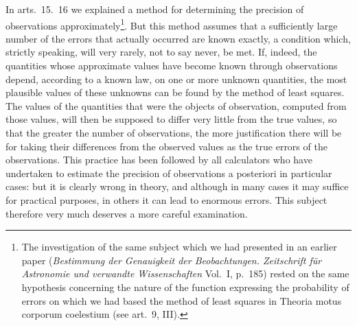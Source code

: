 In arts.\ 15.\ 16 we explained a method for determining the precision of observations approximately\footnote{The investigation of the same subject which we had presented in an earlier paper (\textit{Bestimmung der Genauigkeit der Beobachtungen. Zeitschrift für Astronomie und verwandte Wissenschaften} Vol.\ I, p.\ 185) rested on the same hypothesis concerning the nature of the function expressing the probability of errors on which we had based the method of least squares in Theoria motus corporum coelestium (see art.\ 9, III).}. But this method assumes that a sufficiently large number of the errors that actually occurred are known exactly, a condition which, strictly speaking, will very rarely, not to say never, be met. If, indeed, the quantities whose approximate values have become known through observations depend, according to a known law, on one or more unknown quantities, the most plausible values of these unknowns can be found by the method of least squares. The values of the quantities that were the objects of observation, computed from those values, will then be supposed to differ very little from the
%
true values, so that the greater the number of observations, the more justification there will be for taking their differences from the observed values as the true errors of the observations. This practice has been followed by all calculators who have undertaken to estimate the precision of observations a posteriori in particular cases: but it is clearly wrong in theory, and although in many cases it may suffice for practical purposes, in others it can lead to enormous errors. This subject therefore very much deserves a more careful examination.

